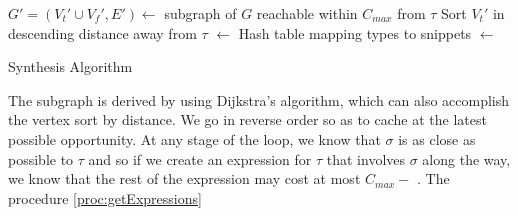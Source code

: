 \begin{algorithm}
\BlankLine
$G'=(V_t'\cup V_f', E') \longleftarrow$ subgraph of $G$ reachable within $C_{max}$ from $\tau$ \;
Sort $V_t'$ in descending distance away from $\tau$ \;
\Snips[$\sigma$] $\longleftarrow$ Hash table mapping types to snippets \;
\Exprs $\longleftarrow$ \Snips[$\tau$] \;
\caption{Synthesis Algorithm}\label{proc:synthesize}
\end{algorithm}

The subgraph is derived by using Dijkstra's algorithm, which can also accomplish the vertex sort by distance. We go in reverse order so as to cache at the latest possible opportunity. At any stage of the loop, we know that $\sigma$ is as close as possible to $\tau$ and so if we create an expression for $\tau$ that involves $\sigma$ along the way, we know that the rest of the expression may cost at most $C_{max} - $ \Dist{$\sigma$}. The procedure \ref{proc:getExpressions} 

